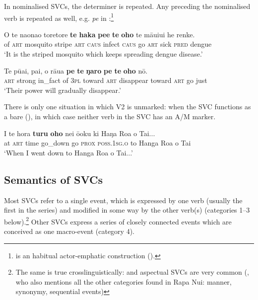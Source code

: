 In nominalised SVCs, the determiner is repeated. Any  preceding the nominalised verb is repeated as well, e.g. \textit{pe} in :\footnote{\label{fn:376} is an habitual actor-emphatic construction ().}

\ea\label{ex:7.175}
\gll O te naonao toretore \textbf{te} \textbf{haka} \textbf{pe{\ꞌ}e} \textbf{te} \textbf{oho} te māuiui he renke. \\
of \textsc{art} mosquito stripe \textsc{art} \textsc{caus} infect \textsc{caus} go \textsc{art} sick \textsc{pred} dengue \\

\glt 
‘It is the striped mosquito which keeps spreading dengue disease.’ \textstyleExampleref{[R535.051]} 
\z

\ea\label{ex:7.176}
\gll Te pūai, pa{\ꞌ}i, o rāua \textbf{pe} \textbf{te} \textbf{ŋaro} \textbf{pe} \textbf{te} \textbf{oho} nō.\\
\textsc{art} strong in\_fact of \textsc{3pl} toward \textsc{art} disappear toward \textsc{art} go just\\

\glt
‘Their power will gradually disappear.’ \textstyleExampleref{[1 Cor. 2:6]}
\z

There is only one situation in which V2 is unmarked: when the SVC functions as a bare  (), in which case neither verb in the SVC has an A/M marker.

\ea\label{ex:7.177}
\gll {\ꞌ}I te hora \textbf{turu} \textbf{oho} nei ō{\ꞌ}oku ki Haŋa Roa o Tai... \\
at \textsc{art} time go\_down go \textsc{prox} \textsc{poss.1sg.o} to Hanga Roa o Tai \\

\glt 
‘When I went down to Hanga Roa o Tai...’ \textstyleExampleref{[R230.059]} 
\z

\subsection{Semantics of SVCs}\label{sec:7.7.3}

Most SVCs refer to a single event, which is expressed by one verb (usually the first in the series) and modified in some way by the other verb(s) (categories 1–3 below).\footnote{\label{fn:377}The same is true crosslinguistically:  and aspectual SVCs are very common (\citealt{Aikhenvald2006}, who also mentions all the other categories found in Rapa Nui: manner, synonymy, sequential events)} Other SVCs express a series of closely connected events which are conceived as one macro-event (category 4).

